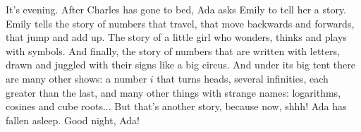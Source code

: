 It's evening. After Charles has gone to bed, Ada asks Emily to tell her a story. Emily tells the story of numbers that travel, that move backwards and forwards, that jump and add up. The story of a little girl who wonders, thinks and plays with symbols. And finally, the story of numbers that are written with letters, drawn and juggled with their signs like a big circus. And under its big tent there are many other shows: a number $i$ that turns heads, several infinities, each greater than the last, and many other things with strange names: logarithms, cosines and cube roots...
But that's another story, because now, shhh! Ada has fallen asleep. Good night, Ada!

\vspace*{\fill}
